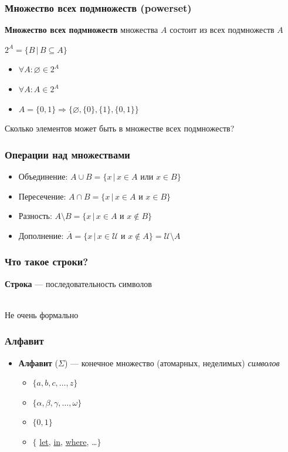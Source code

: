 \documentclass{beamer}
\begin{document}
\begin{frame}[fragile]
  \transwipe[direction=90]
  \frametitle{Множество всех подмножеств (powerset)}
  \textbf{Множество всех подмножеств} множества $A$ состоит из всех подмножеств $A$
  
  \begin{center}
    $2^A = \{ B \, | \, B \subseteq A \}$
  \end{center}
  
  \begin{itemize}
    \item $\forall A: \varnothing \in 2^A$
    \item $\forall A: A \in 2^A$
    \item $A = \{ 0, 1 \} \Rightarrow \{ \varnothing, \{ 0 \}, \{ 1 \}, \{ 0, 1 \} \} $
  \end{itemize}
  
  \pause 
  Сколько элементов может быть в множестве всех подмножеств?
\end{frame}

\begin{frame}[fragile]
  \transwipe[direction=90]
  \frametitle{Операции над множествами}
  \begin{itemize}
    \item Объединение: $A \cup B = \{ x \, | \, x \in A $ или $ x \in B \}$
    \item Пересечение: $A \cap B = \{ x \, | \, x \in A $  и  $ x \in B \}$
    \item Разность: $A \setminus B = \{ x \, | \, x \in A $  и  $ x \notin B \}$
    \item Дополнение: $ \overline{A} = \{ x \, | \, x \in \mathcal{U} $ и $ x \notin A \} = \mathcal{U} \setminus A$    
  \end{itemize}
\end{frame}

\begin{frame}[fragile]
  \transwipe[direction=90]
  \frametitle{Что такое строки?}
  \pause
  \textbf{Строка} --- последовательность символов
  
  \pause
  ~\\ 
  Не очень формально
\end{frame}

\begin{frame}[fragile]
  \transwipe[direction=90]
  \frametitle{Алфавит}
  \begin{itemize}
    \item \textbf{Алфавит} ($\Sigma$) --- конечное множество (атомарных, неделимых) \emph{символов}
    \begin{itemize}
      \item $\{ a, b, c, \dots, z \}$
      \item $\{ \alpha, \beta, \gamma, \dots, \omega \}$
      \item $\{ 0, 1 \}$
      \item $\{$ \underline{let}, \underline{in}, \underline{where}, \dots $\}$
    \end{itemize}    
  \end{itemize}
\end{frame}
\end{document}
